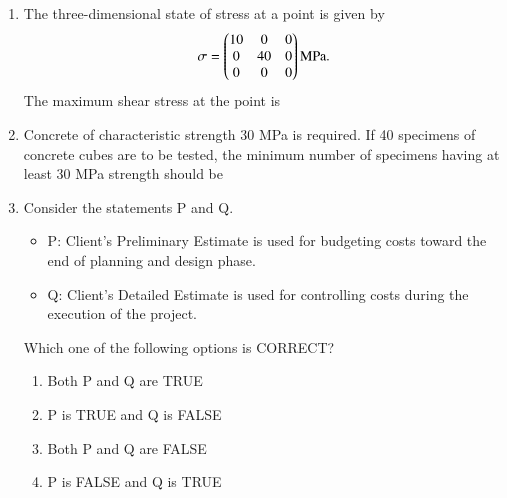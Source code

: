 \documentclass[journal,12pt,onecolumn]{article}
\theoremstyle{remark}
\begin{document}
\begin{enumerate}
    \item The three-dimensional state of stress at a point is given by
    \begin{align}
    \sigma = \begin{pmatrix}10 & 0 & 0 \\ 0 & 40 & 0 \\ 0 & 0 & 0\end{pmatrix} \text{MPa.}
    \end{align}
    The maximum shear stress at the point is

    \hfill{}
    \begin{enumerate}
    \end{enumerate}

    \item Concrete of characteristic strength 30 MPa is required. If 40 specimens of concrete cubes are to be tested, the minimum number of specimens having at least 30 MPa strength should be
    
    \hfill{}
    \begin{enumerate}
    \end{enumerate}

    \item Consider the statements P and Q.
    \begin{itemize}
    \item P: Client's Preliminary Estimate is used for budgeting costs toward the end of planning and design phase.
    \item Q: Client's Detailed Estimate is used for controlling costs during the execution of the project.
    \end{itemize}
    Which one of the following options is CORRECT?

    \hfill{}
    \begin{enumerate}
        \item Both P and Q are TRUE
        \item P is TRUE and Q is FALSE
        \item Both P and Q are FALSE
        \item P is FALSE and Q is TRUE
    \end{enumerate}


\end{enumerate}
\end{document}
